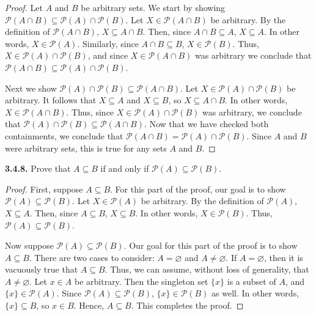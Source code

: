 \documentclass[12pt]{amsart}
\newenvironment{statement}[1]{\smallskip\noindent\color[rgb]{.6627, .3529, .6314} {\bf #1.}}{}
\theoremstyle{definition}
\theoremstyle{remark}
\newcommand{\powerset}[1]{\mathscr{P} \left( #1 \right)}
\begin{document}
\begin{proof}
Let $A$ and $B$ be arbitrary sets.
We start by showing $\powerset{A \cap B} \subseteq \powerset{A} \cap \powerset{B}$.
Let $X \in \powerset{A \cap B}$ be arbitrary.
By the definition of $\powerset{A \cap B}$, $X \subseteq A \cap B$.
Then, since $A \cap B \subseteq A$, $X \subseteq A$.
In other words, $X \in \powerset{A}$.
Similarly, since $A \cap B \subseteq B$, $X \in \powerset{B}$.
Thus, $X \in \powerset{A} \cap \powerset{B}$, and since $X \in \powerset{A \cap B}$ was arbitrary we conclude that $\powerset{A \cap B} \subseteq \powerset{A} \cap \powerset{B}$.

Next we show $\powerset{A} \cap \powerset{B} \subseteq \powerset{A \cap B}$.
Let $X \in \powerset{A} \cap \powerset{B}$ be arbitrary.
It follows that $X \subseteq A$ and $X \subseteq B$, so $X \subseteq A \cap B$.
In other words, $X \in \powerset{A \cap B}$.
Thus, since $X \in \powerset{A} \cap \powerset{B}$ was arbitrary, we conclude that $\powerset{A} \cap \powerset{B} \subseteq \powerset{A \cap B}$.
Now that we have checked both containments, we conclude that $\powerset{A \cap B} = \powerset{A} \cap \powerset{B}$.
Since $A$ and $B$ were arbitrary sets, this is true for any sets $A$ and $B$.
\end{proof}


\begin{statement}{3.4.8}
Prove that $A \subseteq B$ if and only if $\powerset{A} \subseteq \powerset{B}$.
\end{statement}

\begin{proof}
First, suppose $A \subseteq B$.
For this part of the proof, our goal is to show $\powerset{A} \subseteq \powerset{B}$.
Let $X \in \powerset{A}$ be arbitrary.
By the definition of $\powerset{A}$, $X \subseteq A$.
Then, since $A \subseteq B$, $X \subseteq B$.
In other words, $X \in \powerset{B}$.
Thus, $\powerset{A} \subseteq \powerset{B}$.

Now suppose $\powerset{A} \subseteq \powerset{B}$.
Our goal for this part of the proof is to show $A \subseteq B$.
There are two cases to consider: $A = \varnothing$ and $A \neq \varnothing$.
If $A = \varnothing$, then it is vacuously true that $A \subseteq B$.
Thus, we can assume, without loss of generality, that $A \neq \varnothing$.
Let $x \in A$ be arbitrary.
Then the singleton set $\{ x \}$ is a subset of $A$, and $\{ x \} \in \powerset{A}$.
Since $\powerset{A} \subseteq \powerset{B}$, $\{ x \} \in \powerset{B}$ as well.
In other words, $\{ x \} \subseteq B$, so $x \in B$.
Hence, $A \subseteq B$.
This completes the proof.
\end{proof}
\end{document}
